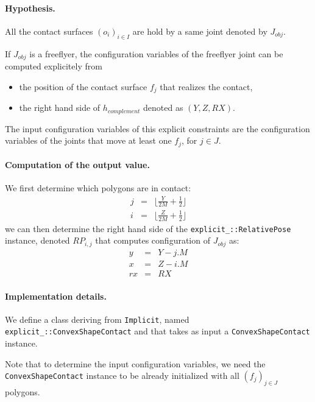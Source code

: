 \documentclass {article}
\begin{document}
\paragraph{Hypothesis.} All the contact surfaces $(o_i)_{i\in I}$ are hold by a
same joint denoted by $J_{obj}$.

 If $J_{obj}$ is a freeflyer, the configuration variables of the
 freeflyer joint can be computed explicitely from
\begin{itemize}
\item the position of the contact surface $f_j$ that realizes the contact,
\item the right hand side of $h_{complement}$ denoted as $(Y,Z,RX)$.
\end{itemize}
The input configuration variables of this explicit constraints are the
configuration variables of the joints that move at least one $f_j$, for $j\in J$.

\paragraph{Computation of the output value.} We first determine which polygons
are in contact:
\begin{eqnarray*}
j &=& \lfloor \frac{Y}{2M} + \frac{1}{2} \rfloor\\
i &=& \lfloor \frac{Z}{2M} + \frac{1}{2} \rfloor
\end{eqnarray*}
we can then determine the right hand side of the \texttt{explicit\_::RelativePose} instance, denoted $RP_{i,j}$ that computes configuration of $J_{obj}$ as:
\begin{eqnarray*}
  y &=& Y - j.M \\
  x &=& Z - i.M \\
  rx &=& RX
\end{eqnarray*}

\paragraph{Implementation details.} We define a class deriving from
\texttt{Implicit}, named \texttt{explicit\_::ConvexShapeContact} and
that takes as input a \texttt{ConvexShapeContact} instance.

Note that to determine the input configuration variables, we need the \texttt{ConvexShapeContact} instance to be already initialized with all $(f_j)_{j\in J}$
polygons.
\end{document}
